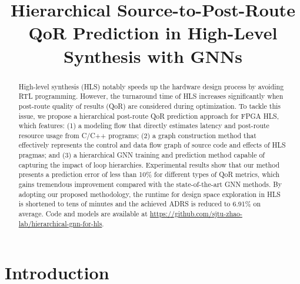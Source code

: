 \documentclass[conference]{IEEEtran}
\begin{document}
\title{Hierarchical Source-to-Post-Route QoR Prediction in High-Level Synthesis with GNNs\vspace{-0.5em}}

\author{
\vspace{-1cm}}


\maketitle
\begingroup\renewcommand\thefootnote{*}
\endgroup

\begin{abstract}
High-level synthesis (HLS) notably speeds up the hardware design process by avoiding RTL programming. However, the turnaround time of HLS increases significantly when post-route quality of results (QoR) are considered during optimization. To tackle this issue, we propose a hierarchical post-route QoR prediction approach for FPGA HLS, which features: (1) a modeling flow that directly estimates latency and post-route resource usage from C/C++ programs; (2) a graph construction method that effectively represents the control and data flow graph of source code and effects of HLS pragmas; and (3) a hierarchical GNN training and prediction method capable of capturing the impact of loop hierarchies. Experimental results show that our method presents a prediction error of less than 10\% for different types of QoR metrics, which gains tremendous improvement compared with the state-of-the-art GNN methods. By adopting our proposed methodology, the runtime for design space exploration in HLS is shortened to tens of minutes and the achieved ADRS is reduced to 6.91\% on average. Code and models are available at \url{https://github.com/sjtu-zhao-lab/hierarchical-gnn-for-hls}.
\end{abstract}

 \vspace{-0.13cm}   
\section{Introduction}
 \vspace{-0.1cm}  
\end{document}
